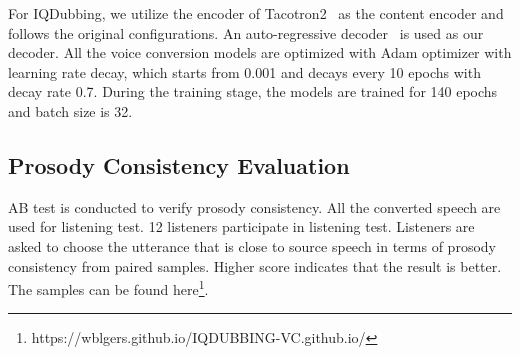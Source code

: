 \documentclass{article}
\begin{document}


For IQDubbing, we utilize the encoder of Tacotron2~\cite{shen2018natural} as the content encoder and  follows the original configurations. An auto-regressive decoder~\cite{wang2021enriching} is used as our decoder. All the voice conversion models are optimized with Adam optimizer with learning rate decay, which starts from 0.001 and decays every 10 epochs with decay rate 0.7. During the training stage, the models are trained for 140 epochs and batch size is 32.


\subsection{Prosody Consistency Evaluation}
\label{ssec:subhead}

AB test is conducted to verify prosody consistency. All the converted speech are used for listening test. 12  listeners participate in listening test. Listeners are asked to choose the utterance  that is close to source speech in terms of  prosody consistency from paired samples. Higher score indicates that the result is better. The samples can be found here\footnote{https://wblgers.github.io/IQDUBBING-VC.github.io/}.
\end{document}
